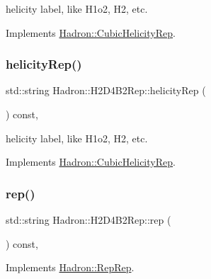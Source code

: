 helicity label, like H1o2, H2, etc. 

Implements \mbox{\hyperlink{structHadron_1_1CubicHelicityRep_af1096946b7470edf0a55451cc662f231}{Hadron\+::\+Cubic\+Helicity\+Rep}}.

\mbox{\label{structHadron_1_1H2D4B2Rep_a1ec65d13eaf3747ef59295d3cd1aa002}} 
\subsubsection{\texorpdfstring{helicityRep()}{helicityRep()}\hspace{0.1cm}{\footnotesize\ttfamily [2/2]}}
{\footnotesize\ttfamily std\+::string Hadron\+::\+H2\+D4\+B2\+Rep\+::helicity\+Rep (\begin{DoxyParamCaption}{ }\end{DoxyParamCaption}) const\hspace{0.3cm}{\ttfamily [inline]}, {\ttfamily [virtual]}}

helicity label, like H1o2, H2, etc. 

Implements \mbox{\hyperlink{structHadron_1_1CubicHelicityRep_af1096946b7470edf0a55451cc662f231}{Hadron\+::\+Cubic\+Helicity\+Rep}}.

\mbox{\label{structHadron_1_1H2D4B2Rep_a8d556a242b6426bf15612422a8e22ce6}} 
\subsubsection{\texorpdfstring{rep()}{rep()}\hspace{0.1cm}{\footnotesize\ttfamily [1/3]}}
{\footnotesize\ttfamily std\+::string Hadron\+::\+H2\+D4\+B2\+Rep\+::rep (\begin{DoxyParamCaption}{ }\end{DoxyParamCaption}) const\hspace{0.3cm}{\ttfamily [inline]}, {\ttfamily [virtual]}}



Implements \mbox{\hyperlink{structHadron_1_1RepRep_ab3213025f6de249f7095892109575fde}{Hadron\+::\+Rep\+Rep}}.

\mbox{\label{structHadron_1_1H2D4B2Rep_a8d556a242b6426bf15612422a8e22ce6}} 
